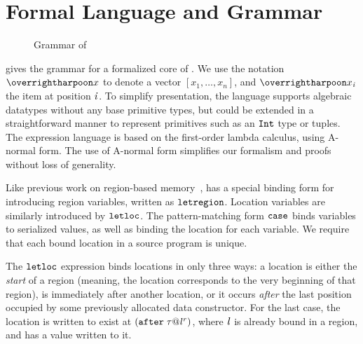 \documentclass[showabstract,showacknowledgments,showpreface,showdedication]{iuphd}
\theoremstyle{nonumberplain}
\begin{document}
\section{Formal Language and Grammar}
\label{subsec:grammar}

\begin{figure}
  
  \caption{Grammar of \ourcalc{}}
  \label{fig:grammar}  
\end{figure}

 gives the grammar for a formalized core of \ourcalc{}.
%
We use the notation $\overharpoon{x}$ to denote a vector $[
x_1, \ldots, x_n]$, and $\overharpoon{x_{\ind}}$ the item at position
$\mathit{i}$.
%
To simplify presentation, the language supports 
algebraic datatypes without any base primitive types, but could be extended in a straightforward
manner to represent primitives such as an $\texttt{Int}$ type or tuples.
%
The expression language is based on the first-order lambda calculus,
using A-normal form.
%
The use of A-normal form simplifies our formalism and proofs
without loss of generality.

Like previous work on region-based memory~\cite{regioncalcs},
\ourcalc{} has a special binding
form for introducing region variables, written as
$\texttt{letregion}$.
%
Location variables are similarly introduced by $\texttt{letloc}$.
%
The pattern-matching form $\texttt{case}$ binds variables to
serialized values, as well as binding the location for each variable.
%
We require that each bound location in
a source program is unique.
%

The $\texttt{letloc}$ expression binds locations in only three ways:
a location is either the \emph{start} of a region (meaning, the
location corresponds to the very beginning of that region), is
immediately after another location, or it occurs \emph{after} the last
position occupied by some previously allocated data constructor.
%
For the last case, the location is written to exist at
$(\texttt{after}\; \mathit{\tau} @ {\mathit{l}}^{\mathit{r}})$, where $\mathit{l}$ is already
bound in a region, and has a value written to it.

\end{document}
